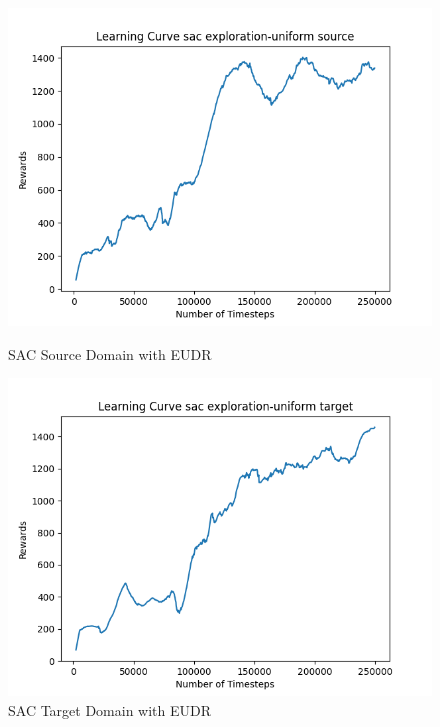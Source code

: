 \documentclass[11pt]{article}
\begin{document}
\begin{figure}[H]
    \centering
    \begin{minipage}{0.45\textwidth}
        \centering
        \includegraphics[width=\textwidth]{../images/Learning_Curve_SAC_EU_Source.png}
        \caption{SAC Source Domain with EUDR}
        \label{fig:sac_source_eudr}
    \end{minipage}
    \hfill
    \begin{minipage}{0.45\textwidth}
        \centering
        \includegraphics[width=\textwidth]{../images/Learning_Curve_SAC_EU_Target.png}
        \caption{SAC Target Domain with EUDR}
        \label{fig:sac_target_eudr}
    \end{minipage}
    \vfill

\end{figure}
\end{document}
